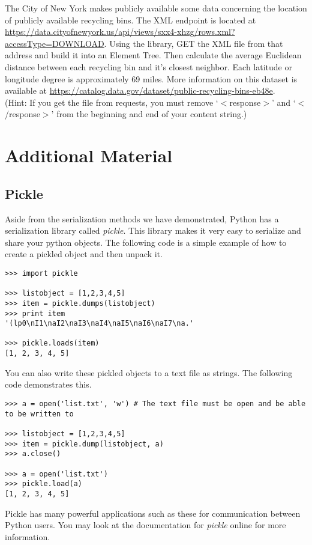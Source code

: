 \begin{problem}
The City of New York makes publicly available some data concerning the location of publicly available recycling bins.
The XML endpoint is located at \url{https://data.cityofnewyork.us/api/views/sxx4-xhzg/rows.xml?accessType=DOWNLOAD}.
Using the  library, GET the XML file from that address and build it into an Element Tree.
Then calculate the average Euclidean distance between each recycling bin and it's closest neighbor.
Each latitude or longitude degree is approximately 69 miles.
More information on this dataset is available at \url{https://catalog.data.gov/dataset/public-recycling-bins-eb48e}.
\\ (Hint: If you get the file from requests, you must remove `$<$response$>$' and `$<$/response$>$' from the beginning and end of your content string.)
\end{problem}


\newpage

\section*{Additional Material}


\subsection*{Pickle}
Aside from the serialization methods we have demonstrated, Python has a serialization library called \emph{pickle}.
This library makes it very easy to serialize and share your python objects.
The following code is a simple example of how to create a pickled object and then unpack it.
\begin{lstlisting}
>>> import pickle

>>> listobject = [1,2,3,4,5]
>>> item = pickle.dumps(listobject)
>>> print item
'(lp0\nI1\naI2\naI3\naI4\naI5\naI6\naI7\na.'

>>> pickle.loads(item)
[1, 2, 3, 4, 5]
\end{lstlisting}

You can also write these pickled objects to a text file as strings. The following code demonstrates this.
\begin{lstlisting}
>>> a = open('list.txt', 'w') # The text file must be open and be able to be written to

>>> listobject = [1,2,3,4,5]
>>> item = pickle.dump(listobject, a)
>>> a.close()

>>> a = open('list.txt')
>>> pickle.load(a)
[1, 2, 3, 4, 5]
\end{lstlisting}

Pickle has many powerful applications such as these for communication between Python users.
You may look at the documentation for \emph{pickle} online for more information.
